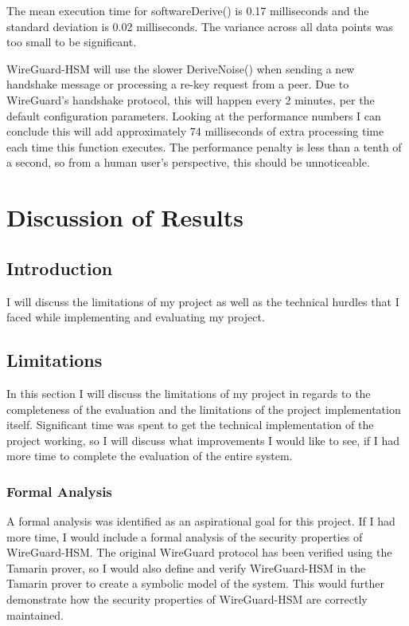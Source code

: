 \documentclass [11pt, proquest] {uwthesis}[2020/02/24]
\begin{document}
The mean execution time for softwareDerive() is 0.17 milliseconds and the standard deviation is 0.02 milliseconds. The variance across all data points was too small to be significant.

WireGuard-HSM will use the slower DeriveNoise() when sending a new handshake message or processing a re-key request from a peer. Due to WireGuard's handshake protocol, this will happen every 2 minutes, per the default configuration parameters. Looking at the performance numbers I can conclude this will add approximately 74 milliseconds of extra processing time each time this function executes. The performance penalty is less than a tenth of a second, so from a human user's perspective, this should be unnoticeable. 

\chapter {Discussion of Results}
\section {Introduction}
I will discuss the limitations of my project as well as the technical hurdles that I faced while implementing and evaluating my project.

\section {Limitations}
In this section I will discuss the limitations of my project in regards to the completeness of the evaluation and the limitations of the project implementation itself. Significant time was spent to get the technical implementation of the project working, so I will discuss what improvements I would like to see, if I had more time to complete the evaluation of the entire system.

\subsection{Formal Analysis}
A formal analysis was identified as an aspirational goal for this project. If I had more time, I would include a formal analysis of the security properties of WireGuard-HSM. The original WireGuard protocol has been verified using the Tamarin prover\cite{donenfeld_formal_2018}, so I would also define and verify WireGuard-HSM in the Tamarin prover to create a symbolic model of the system. This would further demonstrate how the security properties of WireGuard-HSM are correctly maintained.
\end{document}
